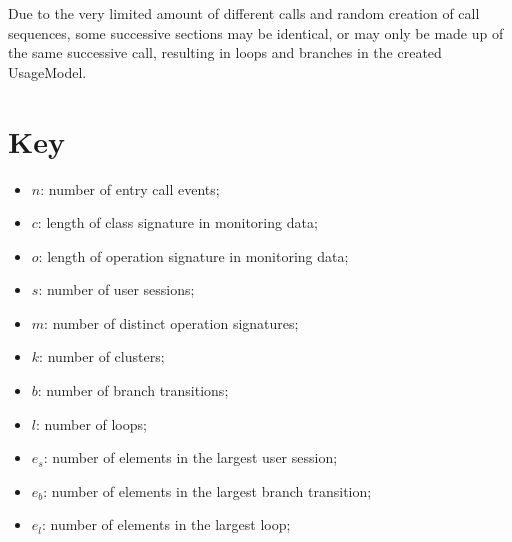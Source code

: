 \documentclass[10pt,a4paper]{article}
\begin{document}
	Due to the very limited amount of different calls and random creation of call sequences, some successive sections may be identical, or may only be made up of the same successive call, resulting in loops and branches in the created UsageModel.
	
	\section{Key}
	\begin{itemize}
		\item $n$: number of entry call events; \vspace{-0.25cm}
		\item $c$: length of class signature in monitoring data; \vspace{-0.25cm}
		\item $o$: length of operation signature in monitoring data; \vspace{-0.25cm}

		\item $s$: number of user sessions; \vspace{-0,25cm}
		\item $m$: number of distinct operation signatures; \vspace{-0,25cm}
		\item $k$: number of clusters; \vspace{-0,25cm}
		\item $b$: number of branch transitions; \vspace{-0,25cm}
		\item $l$: number of loops; \vspace{-0,25cm}
		\item $e_s$: number of elements in the largest user session; \vspace{-0,25cm}
		\item $e_b$: number of elements in the largest branch transition; \vspace{-0,25cm}
		\item $e_l$: number of elements in the largest loop;
	\end{itemize}
	\newpage
\end{document}
